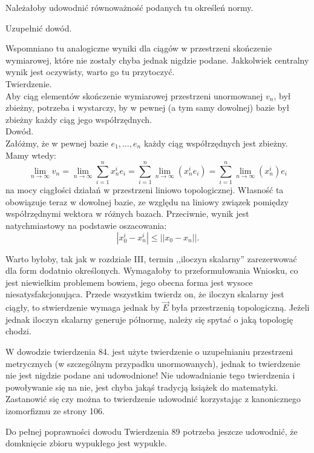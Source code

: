 \documentclass[a4paper,11pt]{article}
\begin{document}
\start {} Należałoby udowodnić równoważność podanych tu określeń
normy.

\start {} Uzupełnić dowód.

\start {} Wspomniano tu analogiczne wyniki dla ciągów w
przestrzeni skończenie wymiarowej, które nie zostały chyba jednak
nigdzie podane. Jakkolwiek centralny wynik jest oczywisty, warto
go tu przytoczyć.\\
Twierdzenie.\\
Aby ciąg elementów skończenie wymiarowej przestrzeni unormowanej
$v_{ n }$, był zbieżny, potrzeba i wystarczy, by w pewnej (a tym samy
dowolnej) bazie był zbieżny każdy ciąg jego
współrzędnych.\\
Dowód.\\
Załóżmy, że w pewnej bazie $e_{ 1 }, \ldots, e_{ n }$ każdy ciąg
współrzędnych jest zbieżny. Mamy wtedy:
$$\lim_{ n \rightarrow
  \infty } v_{ n } = \lim_{ n \rightarrow \infty } \sum_{ i = 1 }^{ n
} x_{ n }^{ i } e_{ i } = \sum_{ i = 1 }^{ n } \lim_{ n \rightarrow
  \infty }( x_{ n }^{ i } e_{ i } ) = \sum_{ i = 1 }^{ n } \lim_{ n
  \rightarrow \infty }( x_{ n }^{ i } ) e_{ i }$$ na mocy ciągłości
działań w przestrzeni liniowo topologicznej. Własność ta obowiązuje
teraz w dowolnej bazie, ze względu na liniowy związek pomiędzy
współrzędnymi wektora w różnych bazach. Przeciwnie, wynik jest
natychmiastowy na podstawie oszacowania:
$$| x_{ 0 }^{ i } - x_{ n }^{ i } | \leq || x_{ 0 } - x_{ n } ||\textrm{.}$$

\start {} Warto byłoby, tak jak w rozdziale III, termin
,,iloczyn skalarny'' zarezerwować dla form dodatnio określonych.
Wymagałoby to przeformułowania Wniosku, co jest niewielkim problemem
bowiem, jego obecna forma jest wysoce niesatysfakcjonująca. Przede
wszystkim twierdz on, że iloczyn skalarny jest ciągły, to stwierdzenie
wymaga jednak by $\vec{ E }$ była przestrzenią topologiczną. Jeżeli
jednak iloczyn skalarny generuje półnormę, należy się spytać o jaką
topologię chodzi.
  
\start {} W dowodzie twierdzenia 84. jest użyte twierdzenie o
uzupełnianiu przestrzeni metrycznych (w szczególnym przypadku
unormowanych), jednak to twierdzenie nie jest nigdzie podane ani
udowodnione! Nie udowadnianie tego twierdzenia i powoływanie się na
nie, jest chyba jakąś tradycją książek do matematyki. Zastanowić się
czy można to twierdzenie udowodnić korzystając z kanonicznego
izomorfizmu ze strony 106.

\start {} Do pełnej poprawności dowodu Twierdzenia 89 potrzeba
jeszcze udowodnić, że domknięcie zbioru wypukłego jest wypukłe.
\end{document}
